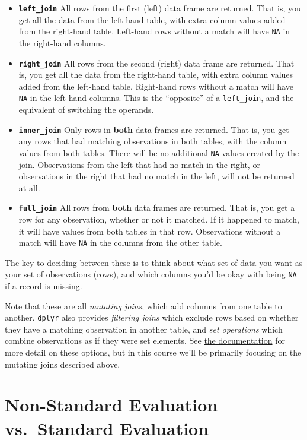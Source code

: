 \documentclass[]{book}
\theoremstyle{definition}
\theoremstyle{definition}
\theoremstyle{remark}
\begin{document}
\begin{itemize}
\item
  \textbf{\texttt{left\_join}} All rows from the first (left) data frame
  are returned. That is, you get all the data from the left-hand table,
  with extra column values added from the right-hand table. Left-hand
  rows without a match will have \texttt{NA} in the right-hand columns.
\item
  \textbf{\texttt{right\_join}} All rows from the second (right) data
  frame are returned. That is, you get all the data from the right-hand
  table, with extra column values added from the left-hand table.
  Right-hand rows without a match will have \texttt{NA} in the left-hand
  columns. This is the ``opposite'' of a \texttt{left\_join}, and the
  equivalent of switching the operands.
\item
  \textbf{\texttt{inner\_join}} Only rows in \textbf{both} data frames
  are returned. That is, you get any rows that had matching observations
  in both tables, with the column values from both tables. There will be
  no additional \texttt{NA} values created by the join. Observations
  from the left that had no match in the right, or observations in the
  right that had no match in the left, will not be returned at all.
\item
  \textbf{\texttt{full\_join}} All rows from \textbf{both} data frames
  are returned. That is, you get a row for any observation, whether or
  not it matched. If it happened to match, it will have values from both
  tables in that row. Observations without a match will have \texttt{NA}
  in the columns from the other table.
\end{itemize}

The key to deciding between these is to think about what set of data you
want as your set of observations (rows), and which columns you'd be okay
with being \texttt{NA} if a record is missing.

Note that these are all \emph{mutating joins}, which add columns from
one table to another. \texttt{dplyr} also provides \emph{filtering
joins} which exclude rows based on whether they have a matching
observation in another table, and \emph{set operations} which combine
observations as if they were set elements. See
\href{https://cran.r-project.org/web/packages/dplyr/vignettes/two-table.html}{the
documentation} for more detail on these options, but in this course
we'll be primarily focusing on the mutating joins described above.

\section{Non-Standard Evaluation vs.~Standard
Evaluation}\label{non-standard-evaluation-vs.standard-evaluation}
\end{document}
